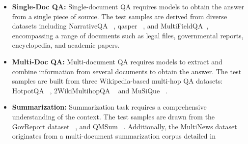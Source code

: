 \begin{itemize}
	\item \textbf{Single-Doc QA:} Single-document QA requires models to obtain the answer from a single piece of source. The test samples are derived from diverse datasets including NarrativeQA ~\citep{kovcisky2018narrativeqa}, qasper ~\citep{dasigi2021dataset}, and MultiFieldQA~\citep{liu2023lost}, encompassing a range of documents such as legal files, governmental reports, encyclopedia, and academic papers.
	
	
	
	
	
	\item \textbf{Multi-Doc QA:} Multi-document QA requires models to extract and combine information from several documents to obtain the answer. The test samples are built from three Wikipedia-based multi-hop QA datasets: HotpotQA ~\citep{yang2018hotpotqa}, 2WikiMultihopQA ~\citep{ho2020constructing} and MuSiQue ~\citep{trivedi2022musique}. 
	
	
	
	
	\item \textbf{Summarization:} Summarization task requires a comprehensive understanding of the context. The test samples are drawn from the GovReport dataset ~\citep{huang2021efficient}, and QMSum ~\citep{zhong2021qmsum}. Additionally, the MultiNews dataset originates from a multi-document summarization corpus detailed in ~\citep{fabbri2019multi}
	
	
	

\end{itemize}
